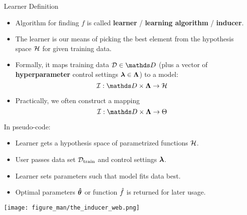 \documentclass[11pt,compress,t,notes=noshow, xcolor=table]{beamer}
\begin{document}
\begin{vbframe}{Learner Definition}

\begin{itemize}

  \item Algorithm for finding  $f$ is called \textbf{learner} / \textbf{learning algorithm} /  \textbf{inducer}.
  
  \item %
  The learner is our means of picking the best element from the hypothesis space $\mathcal{H}$
  for given training data.

\item Formally, it maps training data $\D \in \allDatasets$ (plus a vector of \textbf{hyperparameter} control settings $\bm{\lambda} \in \bm{\Lambda}$) to a model:
{
\vspace{3em}
\[\ind: \preimageInducerShort \rightarrow \Hspace\]
}
\item Practically, we often construct a mapping 
\[\ind: \preimageInducerShort \rightarrow \Theta\]
\end{itemize}


\framebreak
  
In pseudo-code:
\begin{itemize}
  \item Learner gets a hypothesis space of parametrized functions $\mathcal{H}$.
  \item User passes data set $\mathcal{D}_{\text{train}}$ and control settings $\bm{\lambda}$.
  \item Learner sets parameters such that model 
    fits data best.
  \item Optimal parameters $\bm{\hat\theta}$ or function $\hat{f}$ is returned for later usage.

\end{itemize}

  \begin{center}
    \texttt{[image: figure\_man/the\_inducer\_web.png]}
  \end{center}


\end{vbframe}


\endlecture
\end{document}
